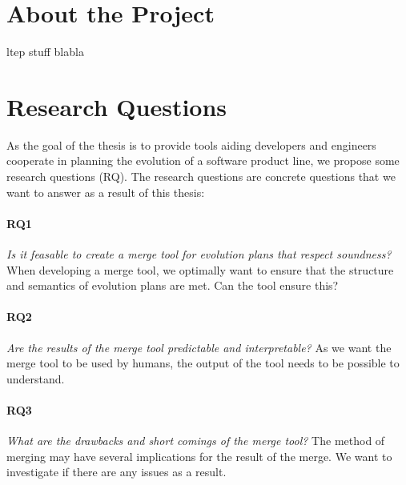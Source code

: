 \documentclass[a4paper,english]{ifimaster}
\begin{document}
\section{About the Project}%
\label{sec:about_the_project}

ltep stuff blabla

\section{Research Questions}%
\label{sec:research_questions}

As the goal of the thesis is to provide tools aiding developers and engineers cooperate in planning the evolution of a software product line, we propose some research questions (RQ). The research questions are concrete questions that we want to answer as a result of this thesis:

\paragraph{RQ1}

\textit{Is it feasable to create a merge tool for evolution plans that respect soundness?} When developing a merge tool, we optimally want to ensure that the structure and semantics of evolution plans are met. Can the tool ensure this?

\paragraph{RQ2}

\textit{Are the results of the merge tool predictable and interpretable?} As we want the merge tool to be used by humans, the output of the tool needs to be possible to understand.

\paragraph{RQ3}

\textit{What are the drawbacks and short comings of the merge tool?} The method of merging may have several implications for the result of the merge. We want to investigate if there are any issues as a result.

\end{document}
